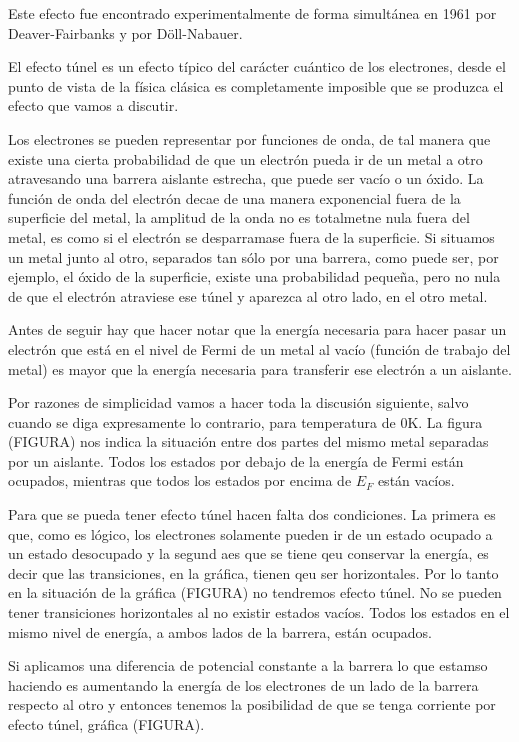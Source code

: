 Este efecto fue encontrado experimentalmente de forma simultánea en 1961 por Deaver-Fairbanks y por Döll-Nabauer.

El efecto túnel es un efecto típico del carácter cuántico de los electrones, desde el punto de vista de la física clásica es completamente imposible que se produzca el efecto que vamos a discutir.

Los electrones se pueden representar por funciones de onda, de tal manera que existe una cierta probabilidad de que un electrón pueda ir de un metal a otro atravesando una barrera aislante estrecha, que puede ser vacío o un óxido. La función de onda del electrón decae de una manera exponencial fuera de la superficie del metal, la amplitud de la onda no es totalmetne nula fuera del metal, es como si el electrón se desparramase fuera de la superficie. Si situamos un metal junto al otro, separados tan sólo por una barrera, como puede ser, por ejemplo, el óxido de la superficie, existe una probabilidad pequeña, pero no nula de que el electrón atraviese ese túnel y aparezca al otro lado, en el otro metal.

Antes de seguir hay que hacer notar que la energía necesaria para hacer pasar un electrón que está en el nivel de Fermi de un metal al vacío (función de trabajo del metal) es mayor que la energía necesaria para transferir ese electrón a un aislante.

Por razones de simplicidad vamos a hacer toda la discusión siguiente, salvo cuando se diga expresamente lo contrario, para temperatura de 0K. La figura (FIGURA) nos indica la situación entre dos partes del mismo metal separadas por un aislante. Todos los estados por debajo de la energía de Fermi están ocupados, mientras que todos los estados por encima de $E_F$ están vacíos.

Para que se pueda tener efecto túnel hacen falta dos condiciones. La primera es que, como es lógico, los electrones solamente pueden ir de un estado ocupado a un estado desocupado y la segund aes que se tiene qeu conservar la energía, es decir que las transiciones, en la gráfica, tienen qeu ser horizontales. Por lo tanto en la situación de la gráfica (FIGURA) no tendremos efecto túnel. No se pueden tener transiciones horizontales al no existir estados vacíos. Todos los estados en el mismo nivel de energía, a ambos lados de la barrera, están ocupados.

Si aplicamos una diferencia de potencial constante a la barrera lo que estamso haciendo es aumentando la energía de los electrones de un lado de la barrera respecto al otro y entonces tenemos la posibilidad de que se tenga corriente por efecto túnel, gráfica (FIGURA).


